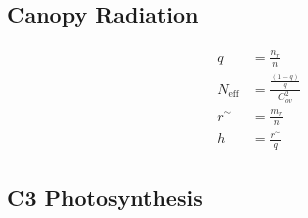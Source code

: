 \documentclass[10pt]{article}
\begin{document}
\subsection*{Canopy Radiation}
\begin{align}
 q  &=  \frac{n_r}{n} \label{eqn:q} \\
 N_\text{eff}  &=  \frac{\frac{(1-q)}{q}}{C_{ov}^{2}} \label{eqn:Neff}\\
 r^{\sim}  &=  \frac{m_r}{n} \label{eqn:rsim} \\
 h  &=  \frac{r^{\sim}}{q} \label{eqn:h} 
\end{align}

\newpage
\subsection*{C3 Photosynthesis}
\end{document}
